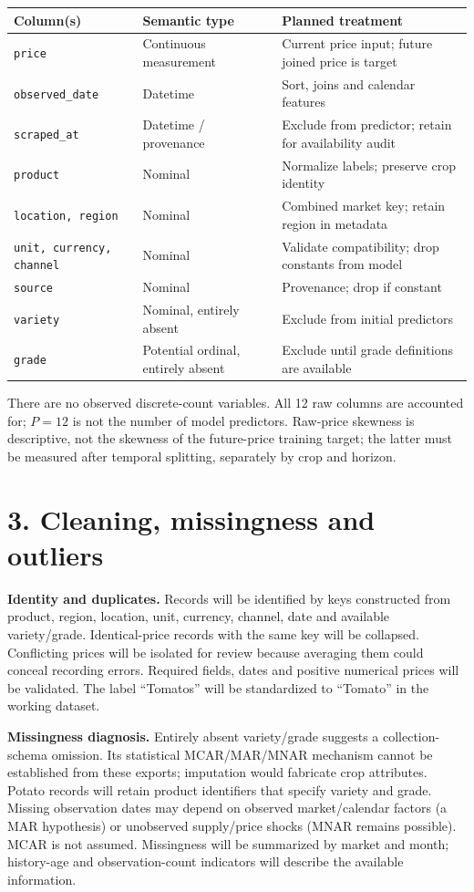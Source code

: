 \documentclass[11pt,a4paper]{article}
\begin{document}
\begin{tabularx}{\textwidth}{@{}lLL@{}}\toprule
Column(s) & Semantic type & Planned treatment\\\midrule
\texttt{price} & Continuous measurement & Current price input; future joined price is target\\
\texttt{observed\_date} & Datetime & Sort, joins and calendar features\\
\texttt{scraped\_at} & Datetime / provenance & Exclude from predictor; retain for availability audit\\
\texttt{product} & Nominal & Normalize labels; preserve crop identity\\
\texttt{location, region} & Nominal & Combined market key; retain region in metadata\\
\texttt{unit, currency, channel} & Nominal & Validate compatibility; drop constants from model\\
\texttt{source} & Nominal & Provenance; drop if constant\\
\texttt{variety} & Nominal, entirely absent & Exclude from initial predictors\\
\texttt{grade} & Potential ordinal, entirely absent & Exclude until grade definitions are available\\\bottomrule
\end{tabularx}

There are no observed discrete-count variables. All 12 raw columns are accounted for; $P=12$ is not the number of model predictors. Raw-price skewness is descriptive, not the skewness of the future-price training target; the latter must be measured after temporal splitting, separately by crop and horizon.
\newpage
\section*{3. Cleaning, missingness and outliers}
\textbf{Identity and duplicates.} Records will be identified by keys constructed from product, region, location, unit, currency, channel, date and available variety/grade. Identical-price records with the same key will be collapsed. Conflicting prices will be isolated for review because averaging them could conceal recording errors. Required fields, dates and positive numerical prices will be validated. The label ``Tomatos'' will be standardized to ``Tomato'' in the working dataset.

\textbf{Missingness diagnosis.} Entirely absent variety/grade suggests a collection-schema omission. Its statistical MCAR/MAR/MNAR mechanism cannot be established from these exports; imputation would fabricate crop attributes. Potato records will retain product identifiers that specify variety and grade. Missing observation dates may depend on observed market/calendar factors (a MAR hypothesis) or unobserved supply/price shocks (MNAR remains possible). MCAR is not assumed. Missingness will be summarized by market and month; history-age and observation-count indicators will describe the available information.
\end{document}
